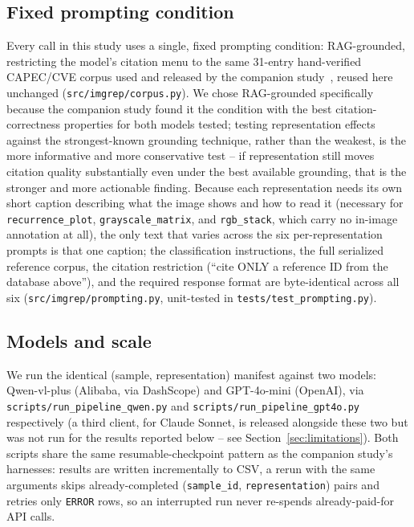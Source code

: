 \documentclass[11pt]{article}
\begin{document}
\subsection{Fixed prompting condition}

Every call in this study uses a single, fixed prompting condition: RAG-grounded, restricting the
model's citation menu to the same 31-entry hand-verified CAPEC/CVE corpus used and released by the
companion study~\cite{groundingcitation2026}, reused here unchanged
(\texttt{src/imgrep/corpus.py}). We chose RAG-grounded specifically because the companion study
found it the condition with the best citation-correctness properties for both models tested; testing
representation effects against the strongest-known grounding technique, rather than the weakest, is
the more informative and more conservative test -- if representation still moves citation quality
substantially even under the best available grounding, that is the stronger and more actionable
finding. Because each representation needs its own short caption describing what the image shows
and how to read it (necessary for \texttt{recurrence\_plot}, \texttt{grayscale\_matrix}, and
\texttt{rgb\_stack}, which carry no in-image annotation at all), the only text that varies across
the six per-representation prompts is that one caption; the classification instructions, the full
serialized reference corpus, the citation restriction (``cite ONLY a reference ID from the database
above''), and the required response format are byte-identical across all six
(\texttt{src/imgrep/prompting.py}, unit-tested in \texttt{tests/test\_prompting.py}).

\subsection{Models and scale}

We run the identical (sample, representation) manifest against two models: Qwen-vl-plus (Alibaba,
via DashScope) and GPT-4o-mini (OpenAI), via \texttt{scripts/run\_pipeline\_qwen.py} and
\texttt{scripts/run\_pipeline\_gpt4o.py} respectively (a third client, for Claude Sonnet, is
released alongside these two but was not run for the results reported below -- see
Section~\ref{sec:limitations}). Both scripts share the same resumable-checkpoint pattern as the
companion study's harnesses: results are written incrementally to CSV, a rerun with the same
arguments skips already-completed (\texttt{sample\_id}, \texttt{representation}) pairs and retries
only \texttt{ERROR} rows, so an interrupted run never re-spends already-paid-for API calls.
\end{document}
